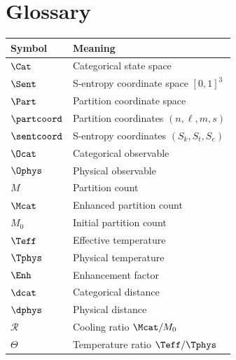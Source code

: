 \section{Glossary}

\begin{center}
\begin{tabular}{ll}
\toprule
\textbf{Symbol} & \textbf{Meaning} \\
\midrule
$\Cat$ & Categorical state space \\
$\Sent$ & S-entropy coordinate space $[0,1]^3$ \\
$\Part$ & Partition coordinate space \\
$\partcoord$ & Partition coordinates $(n, \ell, m, s)$ \\
$\sentcoord$ & S-entropy coordinates $(S_k, S_t, S_e)$ \\
$\Ocat$ & Categorical observable \\
$\Ophys$ & Physical observable \\
$M$ & Partition count \\
$\Mcat$ & Enhanced partition count \\
$M_0$ & Initial partition count \\
$\Teff$ & Effective temperature \\
$\Tphys$ & Physical temperature \\
$\Enh$ & Enhancement factor \\
$\dcat$ & Categorical distance \\
$\dphys$ & Physical distance \\
$\mathcal{R}$ & Cooling ratio $\Mcat/M_0$ \\
$\Theta$ & Temperature ratio $\Teff/\Tphys$ \\
\bottomrule
\end{tabular}
\end{center}

